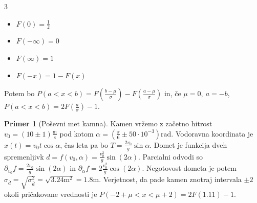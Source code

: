 \documentclass[10pt,landscape]{article}
\theoremstyle{definition}
\newtheorem*{primer}{Primer}
\begin{document}
\begin{multicols}{3}
\begin{itemize}
  \item \( F(0) = \frac{1}{2} \)
  \item \( F(- \infty) = 0 \)
  \item \( F(\infty) = 1 \)
  \item \( F(- x) = 1 - F(x) \)
\end{itemize}

Potem bo \( P(a < x < b) = F \left( \frac{b - \mu}{\sigma} \right) - F \left( \frac{a - \mu}{\sigma} \right) \) in, če \( \mu = 0, \ a = - b \), \( P(a < x < b) = 2F \left( \frac{a}{\sigma} \right) - 1 \).

\begin{primer}[Poševni met kamna]
  Kamen vržemo z začetno hitrost \( v_0 = \left( 10 \pm 1 \right) \frac{\mathrm{m}}{\mathrm{s}} \) pod kotom \( \alpha = \left( \frac{\pi}{6} \pm 50\cdot 10^{-3} \right) \mathrm{rad} \). Vodoravna koordinata je \( x(t) = v_0 t \cos \alpha \), čas leta pa bo \( T = \frac{2v_0}{g} \sin \alpha \). Domet je funkcija dveh spremenljivk \( d = f(v_{0}, \alpha) = \frac{v_0 ^2}{g} \sin (2 \alpha) \). Parcialni odvodi so \( \partial_{v_0} f = \frac{2 v_0}{g} \sin (2 \alpha) \) in \( \partial_{\alpha} f = 2 \frac{v_0 ^2}{g} \cos (2 \alpha) \). Negotovost dometa je potem \( \sigma_{\bar{d}} = \sqrt{\sigma_{\bar{d}} ^2} = \sqrt{3. 24 \mathrm{m} ^2} = 1.8 \mathrm{m} \). Verjetnost, da pade kamen znotraj intervala \( \pm 2 \) okoli pričakovane vrednosti je \( P (-2 + \mu < x < \mu + 2) = 2 F (1.11) - 1 \).
\end{primer}

\end{multicols}
\end{document}
